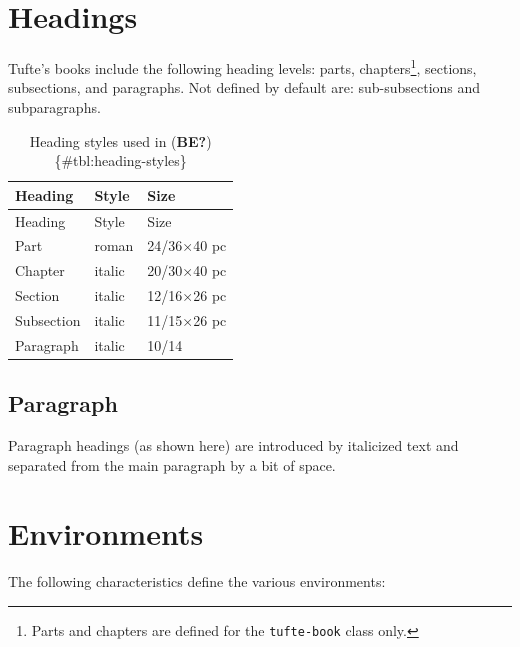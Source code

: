 \documentclass[
  twoside,
  symmetric]{tufte-book}
\begin{document}
\section{Headings}\label{sec:headings1}

Tufte's books include the following heading levels: parts,
chapters\footnote{Parts and chapters are defined for the
  \texttt{tufte-book} class only.}, sections, subsections, and
paragraphs. Not defined by default are: sub-subsections and
subparagraphs.

\begin{longtable}[]{@{}lll@{}}
\caption{Heading styles used in (\textbf{BE?})
\{\#tbl:heading-styles\}}\tabularnewline
\toprule\noalign{}
Heading & Style & Size \\
\midrule\noalign{}
\endfirsthead
\toprule\noalign{}
Heading & Style & Size \\
\midrule\noalign{}
\endhead
\bottomrule\noalign{}
\endlastfoot
Part & roman & 24/36×40 pc \\
Chapter & italic & 20/30×40 pc \\
Section & italic & 12/16×26 pc \\
Subsection & italic & 11/15×26 pc \\
Paragraph & italic & 10/14 \\
\end{longtable}

\subsection*{Paragraph}\label{paragraph}

Paragraph headings (as shown here) are introduced by italicized text and
separated from the main paragraph by a bit of space.

\section{Environments}\label{environments}

The following characteristics define the various environments:
\end{document}
